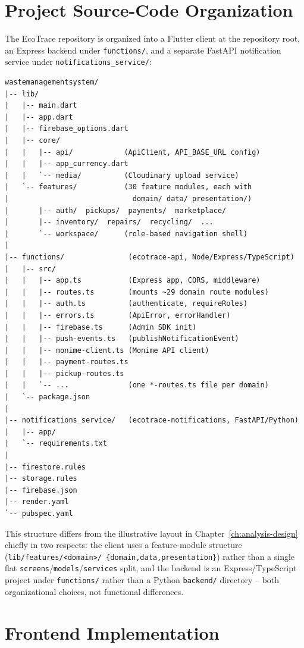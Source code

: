 \section{Project Source-Code Organization}

The EcoTrace repository is organized into a Flutter client at the repository
root, an Express backend under \texttt{functions/}, and a separate FastAPI
notification service under \texttt{notifications\_service/}:

\begin{verbatim}
wastemanagementsystem/
|-- lib/
|   |-- main.dart
|   |-- app.dart
|   |-- firebase_options.dart
|   |-- core/
|   |   |-- api/            (ApiClient, API_BASE_URL config)
|   |   |-- app_currency.dart
|   |   `-- media/          (Cloudinary upload service)
|   `-- features/           (30 feature modules, each with
|                             domain/ data/ presentation/)
|       |-- auth/  pickups/  payments/  marketplace/
|       |-- inventory/  repairs/  recycling/  ...
|       `-- workspace/      (role-based navigation shell)
|
|-- functions/               (ecotrace-api, Node/Express/TypeScript)
|   |-- src/
|   |   |-- app.ts           (Express app, CORS, middleware)
|   |   |-- routes.ts        (mounts ~29 domain route modules)
|   |   |-- auth.ts          (authenticate, requireRoles)
|   |   |-- errors.ts        (ApiError, errorHandler)
|   |   |-- firebase.ts      (Admin SDK init)
|   |   |-- push-events.ts   (publishNotificationEvent)
|   |   |-- monime-client.ts (Monime API client)
|   |   |-- payment-routes.ts
|   |   |-- pickup-routes.ts
|   |   `-- ...              (one *-routes.ts file per domain)
|   `-- package.json
|
|-- notifications_service/   (ecotrace-notifications, FastAPI/Python)
|   |-- app/
|   `-- requirements.txt
|
|-- firestore.rules
|-- storage.rules
|-- firebase.json
|-- render.yaml
`-- pubspec.yaml
\end{verbatim}

This structure differs from the illustrative layout in
Chapter~\ref{ch:analysis-design} chiefly in two respects: the client uses a
feature-module structure (\texttt{lib/features/<domain>/\allowbreak
\{domain,data,presentation\}}) rather than a single flat
\texttt{screens}/\texttt{models}/\texttt{services} split, and the backend is an
Express/TypeScript project under \texttt{functions/} rather than a Python
\texttt{backend/} directory -- both organizational choices, not functional
differences.

\section{Frontend Implementation}

